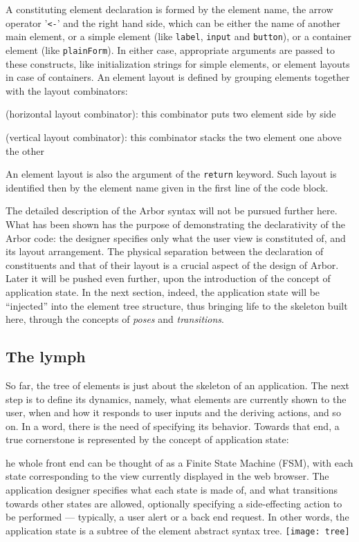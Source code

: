 \documentclass[12pt]{article} %
\newcommand{\be}{back end}
\newcommand{\fe}{front end}
\newcommand{\wb}{web browser}
\newcommand{\abs}{abstract syntax tree}
\newcommand{\A}{Arbor}
\newcommand{\myverb}[1]{\texttt{\footnotesize #1}}
\newcommand{\q}[1]{``#1''}
\newcounter{dccounter}
\newenvironment{dce}[3]
	{\refstepcounter{dccounter}\begin{tcolorbox}[colback=red!5!white,colframe=red!75!black,fonttitle=\bfseries,
size=small,righthand width=3cm,sidebyside,sidebyside align=center seam,lower separated=false,title=Design choice \thedccounter: \emph{#1}\label{#2}]}
	{\tcblower
     \texttt{[image: tree]}%
    \end{tcolorbox}}
\begin{document}
A constituting element declaration is formed by the element name, the arrow operator '\verb|<-|' and the right hand side, which can be either the name of another main element, or a simple element (like \myverb{label}, \myverb{input} and \myverb{button}), or a container element (like \myverb{plainForm}). In either case, appropriate arguments are passed to these constructs, like initialization strings for simple elements, or element layouts in case of containers. 
An element layout is defined by grouping elements together with the layout combinators:
\begin{description}
\item \myverb{<|>} (horizontal layout combinator): this combinator puts two element side by side
\item \myverb{<->} (vertical layout combinator): this combinator stacks the two element one above the other
\end{description}
An element layout is also the argument of the \myverb{return} keyword. Such layout is identified then by the element name given in the first line of the code block. 

The detailed description of the \A{} syntax will not be pursued further here. What has been shown has the purpose of demonstrating the declarativity of the \A{} code: the designer specifies only what the user view is constituted of, and its layout arrangement. The physical separation between the declaration of constituents and that of their layout is a crucial aspect of the design of \A{}. Later it will be pushed even further, upon the introduction of the concept of application state. In the next section, indeed, the application state will be \q{injected} into the element tree structure, thus bringing life to the skeleton built here, through the concepts of \emph{poses} and \emph{transitions}.\\


\subsection{The lymph}\label{lymph}
So far, the tree of elements is just about the skeleton of an application. The next step is to define its dynamics, namely, what elements are currently shown to the user, when and how it responds to user inputs and the deriving actions, and so on. In a word, there is the need of specifying its behavior. Towards that end, a true cornerstone is represented by the concept of application state:

\begin{dce}{\fe{} as a Finite State Machine}{fsm}
The whole \fe{} can be thought of as a Finite State Machine (FSM), with each state corresponding to the view currently displayed in the \wb{}. The application designer specifies what each state is made of, and what transitions towards other states are allowed, optionally specifying a side-effecting action to be performed --- typically, a user alert or a \be{} request. In other words, the application state is a subtree of the element \abs{}.
\end{dce}
\end{document}
